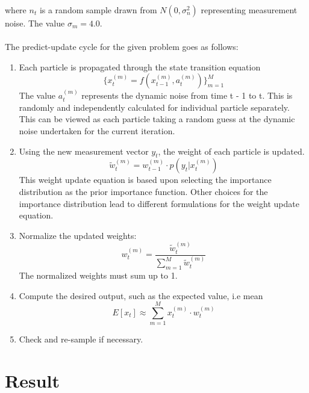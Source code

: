 \documentclass[12pt]{article}
\begin{document}
where $n_t$ is a random sample drawn from $N(0,\sigma_n^2)$ representing measurement noise. The value $\sigma_m = 4.0$.\\
\\ 
The predict-update cycle for the given problem goes as follows:
\begin{enumerate}
	\item Each particle is propagated through the state transition equation
	\begin{equation}
		\lbrace x_t^{(m)} = f(x_{t-1}^{(m)},a_t^{(m)}) \rbrace ^M_{m=1}
		\label{eq:particleTrans}
	\end{equation}
	The value $a_t^{(m)}$ represents the dynamic noise from time t - 1 to t. This is randomly and independently calculated for individual particle separately. This can be viewed as each particle taking a random guess at the dynamic noise undertaken for the current iteration. \\
	
	\item Using the new measurement vector $y_t$, the weight of each particle is updated. 
	\begin{equation}
	\tilde{w}_t^{(m)} = w_{t-1}^{(m)} \cdot p(y_t | x_t^{(m)})
	\label{eq:weightUpdate}
	\end{equation}
	This weight update equation is based upon selecting the importance distribution as the prior importance function. 			Other choices for the importance distribution lead to different formulations for the weight update equation.\\
	
	\item Normalize the updated weights:
	\begin{equation}
		w_t^{(m)} = \frac{\tilde{w}_t^{(m)}}{\sum_{m=1}^M \tilde{w}_t^{(m)}}
		\label{eq:weightNormalize}
	\end{equation}
	The normalized weights must sum up to 1.
	
	\item Compute the desired output, such as the expected value, i.e mean
	\begin{equation}
		E[x_t] \approx \sum_{m=1}^M x_t^{(m)} \cdot w_t^{(m)}
		\label{eq:exp}
	\end{equation}
	
	\item Check and re-sample if necessary.
	
\end{enumerate}

\section{Result}
\end{document}

